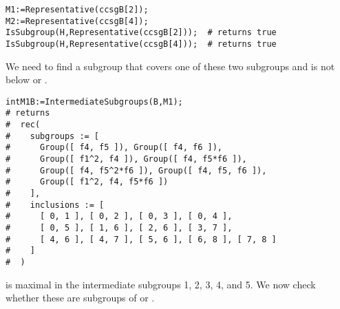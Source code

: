 {\small 
\begin{verbatim}
M1:=Representative(ccsgB[2]);
M2:=Representative(ccsgB[4]);
IsSubgroup(H,Representative(ccsgB[2]));  # returns true
IsSubgroup(H,Representative(ccsgB[4]));  # returns true
\end{verbatim}
}
We need to find a subgroup that covers one of these two subgroups
and is not below  or .
{\small 
\begin{verbatim}
intM1B:=IntermediateSubgroups(B,M1);
# returns 
#  rec( 
#    subgroups := [ 
#      Group([ f4, f5 ]), Group([ f4, f6 ]), 
#      Group([ f1^2, f4 ]), Group([ f4, f5*f6 ]), 
#      Group([ f4, f5^2*f6 ]), Group([ f4, f5, f6 ]), 
#      Group([ f1^2, f4, f5*f6 ]) 
#    ], 
#    inclusions := [ 
#      [ 0, 1 ], [ 0, 2 ], [ 0, 3 ], [ 0, 4 ], 
#      [ 0, 5 ], [ 1, 6 ], [ 2, 6 ], [ 3, 7 ], 
#      [ 4, 6 ], [ 4, 7 ], [ 5, 6 ], [ 6, 8 ], [ 7, 8 ] 
#    ] 
#  )
\end{verbatim}
}
 is maximal in the intermediate subgroups 1, 2, 3, 4, and 5.
We now check whether these are subgroups of  or .

